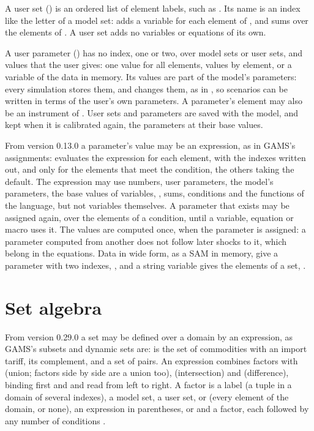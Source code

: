 A user set () is an ordered list of element labels, such as
. Its name is an index like
the letter of a model set:  adds a variable for each element of , and
 sums over the elements of
. A user set adds no variables or equations of its own.

A user parameter () has no index, one or two, over
model sets or user sets, and values that the user gives: one value for all
elements, values by element, or a variable of the data in memory. Its values
are part of the model's parameters: every simulation stores them, and
 changes them, as in , so
scenarios can be written in terms of the user's own parameters. A
parameter's element may also be an instrument of .
User sets and parameters are saved with the model, and kept when it is
calibrated again, the parameters at their base values.

From version 0.13.0 a parameter's value may be an expression, as in GAMS's
assignments:  evaluates the expression for each element, with the indexes
written out, and  only for
the elements that meet the condition, the others taking the default. The
expression may use numbers, user parameters, the model's parameters, the
base values of variables, , sums, conditions and the
functions of the language, but not variables themselves. A parameter that
exists may be assigned again, over the elements of a condition, until a
variable, equation or macro uses it. The values are computed once, when the
parameter is assigned: a parameter computed from another does not follow
later shocks to it, which belong in the equations. Data in wide form, as a
SAM in memory, give a parameter with two indexes,
, and a
string variable gives the elements of a set, .

\section{Set algebra}\label{sec:setalgebra}

From version 0.29.0 a set may be defined over a domain by an expression, as
GAMS's subsets and dynamic sets are: 
is the set of commodities with an import tariff,  its complement, and 
a set of pairs. An expression combines factors with \cmd{+} (union; factors
side by side are a union too), \cmd{*} (intersection) and \cmd{-}
(difference), \cmd{*} binding first and \cmd{+} and \cmd{-} read from left
to right. A factor is a label (a tuple  in a domain of several
indexes), a model set, a user set,  or  (every element of
the domain, or none), an expression in parentheses, or  and a
factor, each followed by any number of conditions \cmd{$(}\cmd{)}.

